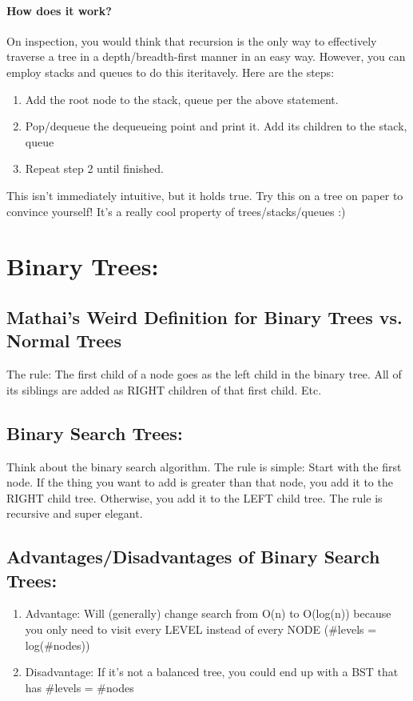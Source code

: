 \documentclass[a4paper,12pt]{report}
\begin{document}
\paragraph{How does it work?}
On inspection, you would think that recursion is the only way to effectively traverse a tree in a depth/breadth-first manner in an easy way. However, you can employ stacks and queues to do this iteritavely. Here are the steps:
\begin{enumerate}
\item Add the root node to the {stack, queue} per the above statement.
\item Pop/dequeue the dequeueing point and print it. Add its children to the {stack, queue}
\item Repeat step 2 until finished. 
\end{enumerate}
This isn't immediately intuitive, but it holds true. Try this on a tree on paper to convince yourself! It's a really cool property of trees/stacks/queues :)

\section{Binary Trees: }
\subsection{Mathai's Weird Definition for Binary Trees vs. Normal Trees}
The rule: The first child of a node goes as the left child in the binary tree. All of its siblings are added as RIGHT children of that first child. Etc.
\subsection{Binary Search Trees: }
Think about the binary search algorithm. The rule is simple: Start with the first node. If the thing you want to add is greater than that node, you add it to the RIGHT child tree. Otherwise, you add it to the LEFT child tree. The rule is recursive and super elegant.
\subsection{Advantages/Disadvantages of Binary Search Trees: }
\begin{enumerate}
\item Advantage: Will (generally) change search from O(n) to O(log(n)) because you only need to visit every LEVEL instead of every NODE (\#levels = log(\#nodes))
\item Disadvantage: If it's not a balanced tree, you could end up with a BST that has \#levels = \#nodes
\end{enumerate}
\end{document}
